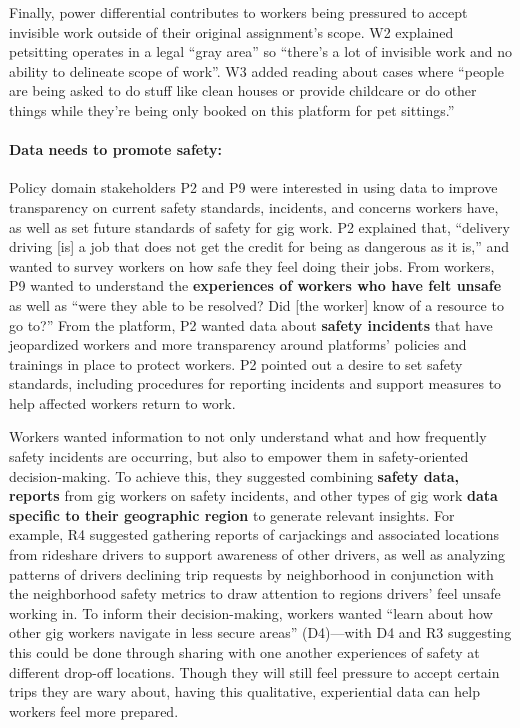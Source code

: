Finally, power differential contributes to workers being pressured to accept invisible work outside of their original assignment’s scope. W2 explained petsitting operates in a legal ``gray area'' so ``there's a lot of invisible work and no ability to delineate scope of work''. W3 added reading about cases where ``people are being asked to do stuff like clean houses or provide childcare or do other things while they're being only booked on this platform for pet sittings.'' 

\paragraph{Data needs to promote safety:}\label{h.xevzq1wr781s}
{Policy domain stakeholders} P2 and P9 were interested in {using data to} improve transparency on current safety standards, incidents, and concerns workers have, as well as set future standards of safety for gig work. P2 explained that, ``delivery driving [is] a job that does not get the credit for being as dangerous as it is,'' and wanted to survey workers on how safe they feel doing their jobs. From workers, P9 wanted to understand the \textbf{experiences of workers who have felt unsafe} as well as ``were they able to be resolved? Did [the worker] know of a resource to go to?'' From the platform, P2 wanted data about \textbf{safety incidents} that have jeopardized workers and more transparency around platforms' policies and trainings in place to protect workers. P2 pointed out a desire to set safety standards, including procedures for reporting incidents and support measures to help affected workers return to work.

Workers wanted information to not only understand what and how frequently safety incidents are occurring, but also to empower them in safety-oriented decision-making. To achieve this, they suggested combining \textbf{safety data, reports} from gig workers on safety incidents, and other types of gig work \textbf{data specific to their geographic region} to generate relevant insights. For example, R4 suggested gathering reports of carjackings and associated locations from rideshare drivers to support awareness of other drivers{, as well as} analyzing patterns of drivers declining trip requests by neighborhood in conjunction with the neighborhood safety metrics to draw attention to regions drivers’ feel unsafe working in.  
To inform their decision-making, workers wanted ``learn about how other gig workers navigate in less secure areas'' (D4)---with D4 and R3 suggesting this could be done through sharing with one another experiences of safety at different drop-off locations. Though they will still feel pressure to accept certain trips they are wary about, having this qualitative, experiential data can help workers feel more prepared. 

